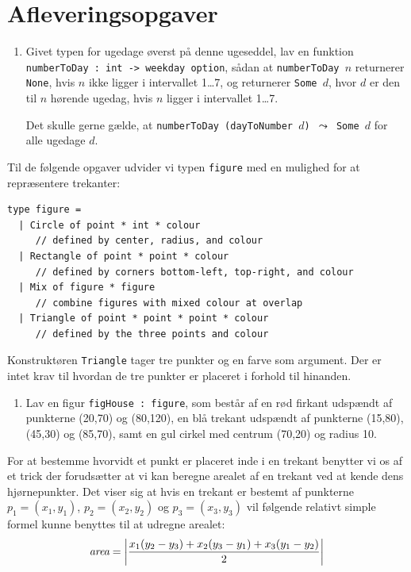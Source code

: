 \documentclass[a4paper,12pt]{article}
\begin{document}
\section*{Afleveringsopgaver}

\begin{enumerate}[label=8g.\arabic*,start=0]

\item Givet typen for ugedage øverst på denne ugeseddel, lav en
  funktion \texttt{numberToDay : int -> weekday option}, sådan at
  \texttt{numberToDay $n$} returnerer \texttt{None}, hvis $n$ ikke
  ligger i intervallet 1\ldots7, og returnerer \texttt{Some $d$}, hvor
  $d$ er den til $n$ hørende ugedag, hvis $n$ ligger i intervallet
  1\ldots7.

  Det skulle gerne gælde, at \texttt{numberToDay (dayToNumber $d$)
    $\leadsto$ Some $d$} for alle ugedage $d$.

\end{enumerate}

Til de følgende opgaver udvider vi typen \texttt{figure} med en mulighed for at repræsentere trekanter:

\begin{lstlisting}[numbers=none,frame=none,mathescape]
type figure =
  | Circle of point * int * colour
     // defined by center, radius, and colour
  | Rectangle of point * point * colour
     // defined by corners bottom-left, top-right, and colour
  | Mix of figure * figure
     // combine figures with mixed colour at overlap
  | Triangle of point * point * point * colour
     // defined by the three points and colour
\end{lstlisting}

\noindent
Konstruktøren \texttt{Triangle} tager tre punkter og en farve som
argument. Der er intet krav til hvordan de tre punkter er placeret i
forhold til hinanden.

\begin{enumerate}[label=8g.\arabic*,start=1]

\item Lav en figur \texttt{figHouse : figure}, som består af en rød
  firkant udspændt af punkterne (20,70) og (80,120), en blå trekant udspændt af
  punkterne (15,80), (45,30) og (85,70), samt en gul cirkel med centrum (70,20) og radius
  10.

\end{enumerate}

For at bestemme hvorvidt et punkt er placeret inde i en trekant
benytter vi os af et trick der forudsætter at vi kan beregne arealet
af en trekant ved at kende dens hjørnepunkter. Det viser sig at hvis
en trekant er bestemt af punkterne $p_1=(x_1,y_1)$, $p_2=(x_2,y_2)$ og
$p_3=(x_3,y_3)$ vil følgende relativt simple formel kunne benyttes til
at udregne arealet:
\[
\emph{area} = \left | \dfrac{x_1(y_2-y_3) + x_2(y_3-y_1) + x_3(y_1-y_2)}{2} \right |
\]
\end{document}
